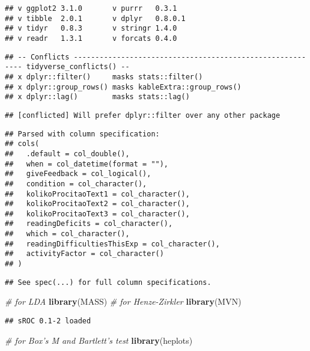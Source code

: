 \documentclass[12pt,]{article}
\newenvironment{Shaded}{\begin{snugshade}}{\end{snugshade}}
\newcommand{\CommentTok}[1]{\textcolor[rgb]{0.56,0.35,0.01}{\textit{#1}}}
\newcommand{\KeywordTok}[1]{\textcolor[rgb]{0.13,0.29,0.53}{\textbf{#1}}}
\newcommand{\NormalTok}[1]{#1}
\begin{document}
\begin{verbatim}
## v ggplot2 3.1.0       v purrr   0.3.1  
## v tibble  2.0.1       v dplyr   0.8.0.1
## v tidyr   0.8.3       v stringr 1.4.0  
## v readr   1.3.1       v forcats 0.4.0
\end{verbatim}

\begin{verbatim}
## -- Conflicts ---------------------------------------------------------- tidyverse_conflicts() --
## x dplyr::filter()     masks stats::filter()
## x dplyr::group_rows() masks kableExtra::group_rows()
## x dplyr::lag()        masks stats::lag()
\end{verbatim}

\begin{verbatim}
## [conflicted] Will prefer dplyr::filter over any other package
\end{verbatim}

\begin{verbatim}
## Parsed with column specification:
## cols(
##   .default = col_double(),
##   when = col_datetime(format = ""),
##   giveFeedback = col_logical(),
##   condition = col_character(),
##   kolikoProcitaoText1 = col_character(),
##   kolikoProcitaoText2 = col_character(),
##   kolikoProcitaoText3 = col_character(),
##   readingDeficits = col_character(),
##   which = col_character(),
##   readingDifficultiesThisExp = col_character(),
##   activityFactor = col_character()
## )
\end{verbatim}

\begin{verbatim}
## See spec(...) for full column specifications.
\end{verbatim}

\begin{Shaded}
\begin{Highlighting}[]
\CommentTok{# for LDA}
\KeywordTok{library}\NormalTok{(MASS)}
\CommentTok{# for Henze-Zirkler}
\KeywordTok{library}\NormalTok{(MVN)}
\end{Highlighting}
\end{Shaded}

\begin{verbatim}
## sROC 0.1-2 loaded
\end{verbatim}

\begin{Shaded}
\begin{Highlighting}[]
\CommentTok{# for Box's M and Bartlett's test}
\KeywordTok{library}\NormalTok{(heplots)}
\end{Highlighting}
\end{Shaded}
\end{document}
